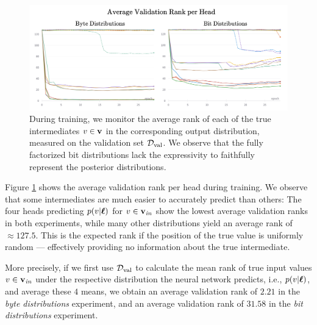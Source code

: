 \begin{figure}[h]
	\centering
	\includegraphics[width=\linewidth]{figures/average_ranks.png}
	\caption{During training, we monitor the average rank of each of the true intermediates $v \in \mathbf{v}$ in the corresponding output distribution, measured on the validation set $\mathcal{D}_{\text{val}}$. We observe that the fully factorized bit distributions lack the expressivity to faithfully represent the posterior distributions.}
	\label{fig:avg_rank}
\end{figure}
Figure \ref{fig:avg_rank} shows the average validation rank per head during training. We observe that some intermediates are much easier to accurately predict than others: The four heads predicting $p(v | \boldsymbol{\ell})$ for $v \in \mathbf{v}_{\mathit{in}}$ show the lowest average validation ranks in both experiments, while many other distributions yield an average rank of $\approx 127.5$. This is the expected rank if the position of the true value is uniformly random --- effectively providing no information about the true intermediate.

More precisely, if we first use $\mathcal{D}_{\text{val}}$ to calculate the mean rank of true input values $v \in \mathbf{v}_{\mathit{in}}$ under the respective distribution the neural network predicts, i.e., $p(v | \boldsymbol{\ell})$, and average these $4$ means, we obtain an average validation rank of $2.21$ in the \emph{byte distributions} experiment, and an average validation rank of $31.58$ in the \emph{bit distributions} experiment. 

